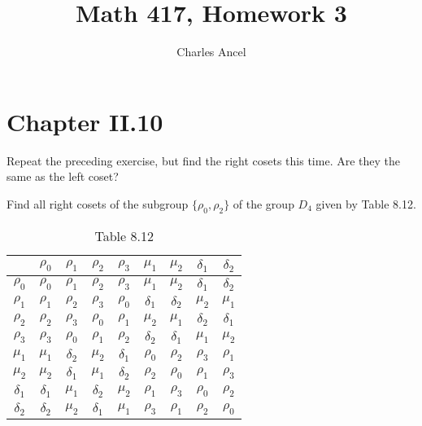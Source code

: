 \documentclass[12pt]{amsart}
\title{Math 417, Homework 3}
\author{Charles Ancel}
\theoremstyle{definition}
\numberwithin{equation}{section}
\theoremstyle{plain}
\begin{document}
\maketitle

\section*{Chapter II.10}
\begin{exercise}{10} Repeat the preceding exercise, but find the right cosets this time. Are they the same as the left coset?

    Find all right cosets of the subgroup $\{\rho_0,\rho_2\}$ of the group $D_4$ given by Table 8.12.
    \begin{table}[ht]
        \centering
        \caption{Table 8.12}
        \begin{tabular}{|c|c|c|c|c|c|c|c|c|}
        \hline
        & \(\rho_0\) & \(\rho_1\) & \(\rho_2\) & \(\rho_3\) & \(\mu_1\) & \(\mu_2\) & \(\delta_1\) & \(\delta_2\) \\
        \hline
        \(\rho_0\) &\(\rho_0\) & \(\rho_1\) & \(\rho_2\) & \(\rho_3\) & \(\mu_1\) & \(\mu_2\) & \(\delta_1\) & \(\delta_2\)\\
        \hline
        \(\rho_1\) & \(\rho_1\) & \(\rho_2\) & \(\rho_3\) & \(\rho_0\) & \(\delta_1\) & \(\delta_2\) & \(\mu_2\) & \(\mu_1\) \\
        \hline
        \(\rho_2\) & \(\rho_2\) & \(\rho_3\) & \(\rho_0\) & \(\rho_1\) & \(\mu_2\) & \(\mu_1\) & \(\delta_2\) & \(\delta_1\) \\
        \hline
        \(\rho_3\) & \(\rho_3\) & \(\rho_0\) & \(\rho_1\) & \(\rho_2\) & \(\delta_2\) & \(\delta_1\) & \(\mu_1\) & \(\mu_2\) \\
        \hline
        \(\mu_1\) & \(\mu_1\) & \(\delta_2\) & \(\mu_2\) & \(\delta_1\) & \(\rho_0\) & \(\rho_2\) & \(\rho_3\) & \(\rho_1\) \\
        \hline
        \(\mu_2\) & \(\mu_2\) & \(\delta_1\) & \(\mu_1\) & \(\delta_2\) & \(\rho_2\) & \(\rho_0\) & \(\rho_1\) & \(\rho_3\) \\
        \hline
        \(\delta_1\) & \(\delta_1\) & \(\mu_1\) & \(\delta_2\) & \(\mu_2\) & \(\rho_1\) & \(\rho_3\) & \(\rho_0\) & \(\rho_2\) \\
        \hline
        \(\delta_2\) & \(\delta_2\) & \(\mu_2\) & \(\delta_1\) & \(\mu_1\) & \(\rho_3\) & \(\rho_1\) & \(\rho_2\) & \(\rho_0\) \\
        \hline
        \end{tabular}
        \end{table}        
    

\end{exercise}
\end{document}
